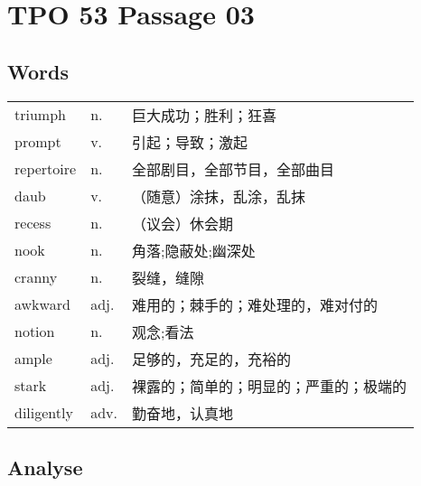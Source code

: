 \section{TPO 53 Passage 03}

\subsection{Words}

\begin{tabular}{lll}
    triumph    & n.   & 巨大成功；胜利；狂喜          \\
    prompt     & v.   & 引起；导致；激起            \\
    repertoire & n.   & 全部剧目，全部节目，全部曲目      \\
    daub       & v.   & （随意）涂抹，乱涂，乱抹        \\
    recess     & n.   & （议会）休会期             \\
    nook       & n.   & 角落;隐蔽处;幽深处          \\
    cranny     & n.   & 裂缝，缝隙               \\
    awkward    & adj. & 难用的；棘手的；难处理的，难对付的   \\
    notion     & n.   & 观念;看法               \\
    ample      & adj. & 足够的，充足的，充裕的         \\
    stark      & adj. & 裸露的；简单的；明显的；严重的；极端的 \\
    diligently & adv. & 勤奋地，认真地             \\
\end{tabular}

\subsection{Analyse}

